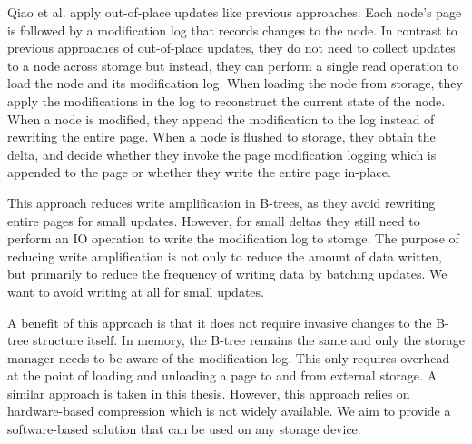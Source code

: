 Qiao et al. apply out-of-place updates like previous approaches.
Each node's page is followed by a modification log that records changes to the node.
In contrast to previous approaches of out-of-place updates, they do not need to collect updates to a node across storage but instead, they can perform a single read operation to load the node and its modification log.
When loading the node from storage, they apply the modifications in the log to reconstruct the current state of the node.
When a node is modified, they append the modification to the log instead of rewriting the entire page.
When a node is flushed to storage, they obtain the delta, and decide whether they invoke the page modification logging which is appended to the page or whether they write the entire page in-place.

This approach reduces write amplification in B-trees, as they avoid rewriting entire pages for small updates.
However, for small deltas they still need to perform an \ac{IO} operation to write the modification log to storage.
The purpose of reducing write amplification is not only to reduce the amount of data written, but primarily to reduce the frequency of writing data by batching updates.
We want to avoid writing at all for small updates.

A benefit of this approach is that it does not require invasive changes to the B-tree structure itself.
In memory, the B-tree remains the same and only the storage manager needs to be aware of the modification log.
This only requires overhead at the point of loading and unloading a page to and from external storage.
A similar approach is taken in this thesis.
However, this approach relies on hardware-based compression which is not widely available.
We aim to provide a software-based solution that can be used on any storage device.

    